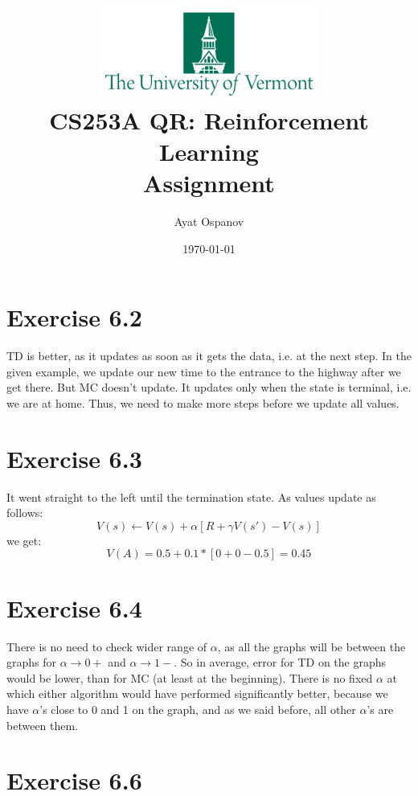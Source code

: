 \documentclass[12pt]{article}
\title{\Large\includegraphics[height=3cm]{pics/UVM.png} \\
    CS253A QR: Reinforcement Learning\\
    Assignment \textnumero 7}
\author{Ayat Ospanov}
\date{\today}
\begin{document}
    \maketitle
    \tableofcontents

    \section{Exercise 6.2}
        TD is better, as it updates as soon as it gets the data, i.e. at the next
        step. In the given example, we update our new time to the entrance to
        the highway after we get there. But MC doesn't update. It updates only
        when the state is terminal, i.e. we are at home. Thus, we need to make
        more steps before we update all values.

    \section{Exercise 6.3}
        It went straight to the left until the termination state. As values update
        as follows:
        $$V(s) \leftarrow V(s) + \alpha [R + \gamma V(s') - V(s)]$$
        we get:
        $$V(A) = 0.5 + 0.1 * [0 + 0 - 0.5] = 0.45$$

    \section{Exercise 6.4}
        There is no need to check wider range of $\alpha$, as all the graphs
        will be between the graphs for $\alpha \rightarrow 0+$ and $\alpha
        \rightarrow 1-$.
        So in average, error for TD on the graphs would be lower, than for MC
        (at least at the beginning). There is no fixed $\alpha$ at which either
        algorithm would have performed significantly better, because we have
        $\alpha$'s close to 0 and 1 on the graph, and as we said before, all
        other $\alpha$'s are between them.

    \section{Exercise 6.6}
\end{document}
